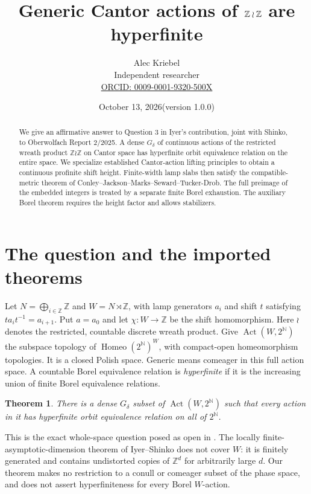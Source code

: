 \documentclass[11pt]{article}
\title{Generic Cantor actions of $\Z\wr\Z$ are hyperfinite}
\author{Alec Kriebel\\\small Independent researcher\\\small\href{https://orcid.org/0009-0001-9320-500X}{ORCID: 0009-0001-9320-500X}}
\date{October 13, 2026\quad (version 1.0.0)}
\newcommand{\Z}{\mathbb Z}
\newcommand{\C}{2^{\mathbb N}}
\newcommand{\Act}{\operatorname{Act}}
\newtheorem{theorem}{Theorem}
\begin{document}
\maketitle
\begin{abstract}
We give an affirmative answer to Question 3 in Iyer's contribution, joint with
Shinko, to Oberwolfach Report 2/2025. A dense $G_\delta$ of continuous actions
of the restricted wreath product $\Z\wr\Z$ on Cantor space has hyperfinite
orbit equivalence relation on the entire space. We specialize established
Cantor-action lifting principles to obtain a continuous profinite shift height.
Finite-width lamp slabs then satisfy the compatible-metric theorem of
Conley--Jackson--Marks--Seward--Tucker-Drob. The full preimage of the embedded
integers is treated by a separate finite Borel exhaustion. The auxiliary Borel
theorem requires the height factor and allows stabilizers.
\end{abstract}

\section{The question and the imported theorems}
Let $N=\bigoplus_{i\in\Z}\Z$ and $W=N\rtimes\Z$, with lamp generators $a_i$
and shift $t$ satisfying $ta_it^{-1}=a_{i+1}$. Put $a=a_0$ and let
$\chi:W\to\Z$ be the shift homomorphism. Here $\wr$ denotes the restricted,
countable discrete wreath product. Give $\Act(W,\C)$ the subspace topology of
$\operatorname{Homeo}(\C)^W$, with compact-open homeomorphism topologies.
It is a closed Polish space. Generic means comeager in this full action space.
A countable Borel equivalence relation is \emph{hyperfinite} if it is the
increasing union of finite Borel equivalence relations.

\begin{theorem}\label{main}
There is a dense $G_\delta$ subset of $\Act(W,\C)$ such that every action in
it has hyperfinite orbit equivalence relation on all of $\C$.
\end{theorem}

This is the exact whole-space question posed as open in
\cite[printed p.~115, Question~3]{OWR}. The locally finite-asymptotic-dimension
theorem of Iyer--Shinko \cite{IS} does not cover $W$: it is finitely generated
and contains undistorted copies of $\Z^d$ for arbitrarily large $d$.
Our theorem makes no restriction to a conull or comeager subset of the phase
space, and does not assert hyperfiniteness for every Borel $W$-action.
\end{document}
